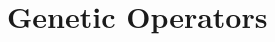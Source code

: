 \documentclass{manual}
\begin{document}
        \section{Genetic Operators}
        
        
        
        
        

        \newpage
        

%
\begin{appendix}
%
\end{appendix}
%







\cleardoublepage
{}




\cleardoublepage
{}
\printindex
\end{document}
